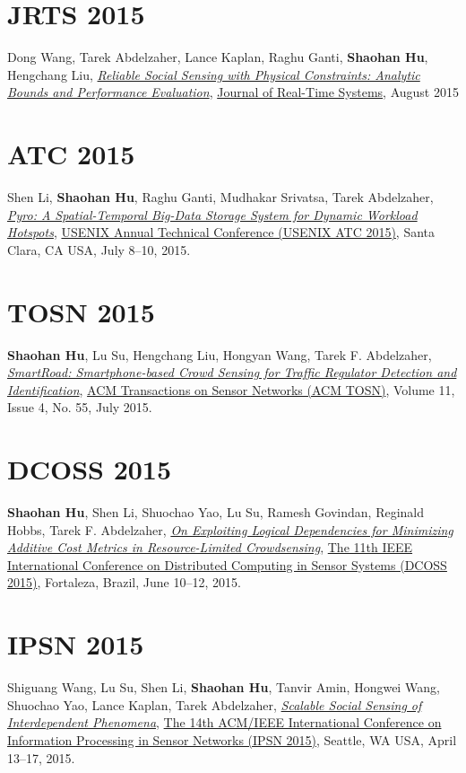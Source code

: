 \section{\sc JRTS 2015}\hypertarget{wang2015jrts}{}
Dong Wang, Tarek Abdelzaher, Lance Kaplan, Raghu Ganti, \textbf{Shaohan Hu}, Hengchang Liu,
\href{http://link.springer.com/article/10.1007%2Fs11241-015-9238-8}{\emph{Reliable Social Sensing with Physical Constraints: Analytic Bounds and Performance Evaluation}},
\href{http://link.springer.com/journal/11241}{\textsf{Journal of Real-Time Systems}},
August 2015

\section{\sc ATC 2015}\hypertarget{li2015atc}{}
Shen Li, \textbf{Shaohan Hu}, Raghu Ganti, Mudhakar Srivatsa, Tarek Abdelzaher,
\href{https://www.usenix.org/system/files/conference/atc15/atc15-paper-li-shen.pdf}{\emph{Pyro: A Spatial-Temporal Big-Data Storage System for Dynamic Workload Hotspots}},
\href{https://www.usenix.org/conference/atc15}{\textsf{USENIX Annual Technical Conference (USENIX ATC 2015)}},
Santa Clara, CA USA, July 8--10, 2015.

\section{\sc TOSN 2015}\hypertarget{hu2015tosn}{}
\textbf{Shaohan Hu}, Lu Su, Hengchang Liu, Hongyan Wang, Tarek F. Abdelzaher,
\href{http://dl.acm.org/citation.cfm?id=2770876}{\emph{SmartRoad: Smartphone-based Crowd Sensing for Traffic Regulator Detection and Identification}},
\href{http://tosn.acm.org/}{\textsf{ACM Transactions on Sensor Networks (ACM TOSN)}},
Volume 11, Issue 4, No. 55, July 2015.

\section{\sc DCOSS 2015}\hypertarget{hu2015dcoss}{}
\textbf{Shaohan Hu}, Shen Li, Shuochao Yao, Lu Su, Ramesh Govindan, Reginald Hobbs, Tarek F. Abdelzaher,
\href{http://ieeexplore.ieee.org/xpl/articleDetails.jsp?arnumber=7165037}{\emph{On Exploiting Logical Dependencies for Minimizing Additive Cost Metrics in Resource-Limited Crowdsensing}},
\href{http://www.dcoss.org/}{\textsf{The 11th IEEE International Conference on Distributed Computing in Sensor Systems (DCOSS 2015)}},
Fortaleza, Brazil, June 10--12, 2015.

\section{\sc IPSN 2015}\hypertarget{wang2015ipsn}{}
Shiguang Wang, Lu Su, Shen Li, \textbf{Shaohan Hu}, Tanvir Amin, Hongwei Wang, Shuochao Yao, Lance Kaplan, Tarek Abdelzaher,
\href{http://dl.acm.org/citation.cfm?id=2737114}{\emph{Scalable Social Sensing of Interdependent Phenomena}},
\href{http://ipsn.acm.org/2015/}{\textsf{The 14th ACM/IEEE International Conference on Information Processing in Sensor Networks (IPSN 2015)}},
Seattle, WA USA, April 13--17, 2015.

